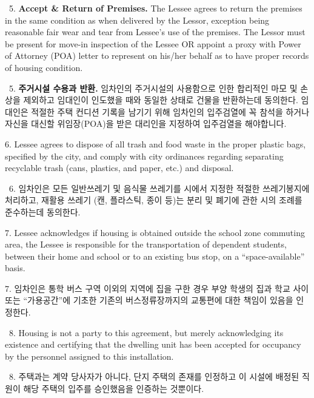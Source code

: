 \documentclass[10pt, letterpaper]{article}
\newcommand{\ul}[1]{\underline{\makebox[#1]{}}}
\newcommand{\init}{\ul{1cm}\ }
\begin{document}
\vspace{3pt}

\init 5. \textbf{Accept \& Return of Premises.} The Lessee agrees to return the premises in the same condition as when delivered by the Lessor, exception being reasonable fair wear and tear from Lessee's use of the premises. The Lessor must be present for move-in inspection of the Lessee OR appoint a proxy with Power of Attorney (POA) letter to represent on his/her behalf as to have proper records of housing condition.

\init 5. \textbf{주거시설 수용과 반환.} 임차인의 주거시설의 사용함으로 인한 합리적인 마모 및 손상을 제외하고 임대인이 인도했을 때와 동일한 상태로 건물을 반환하는데 동의한다. 임대인은 적절한 주택 컨디션 기록을 남기기 위해 임차인의 입주검열에 꼭 참석을 하거나 자신을 대신할 위임장(POA)을 받은 대리인을 지정하여 입주검열을 해야합니다.

\vspace{3pt}

6. Lessee agrees to dispose of all trash and food waste in the proper plastic bags, specified by the city, and comply with city ordinances regarding separating recyclable trash (cans, plastics, and paper, etc.) and disposal.

\init 6. 임차인은 모든 일반쓰레기 및 음식물 쓰레기를 시에서 지정한 적절한 쓰레기봉지에 처리하고, 재활용 쓰레기 (캔, 플라스틱, 종이 등)는 분리 및 폐기에 관한 시의 조례를 준수하는데 동의한다.

\vspace{3pt}

7. Lessee acknowledges if housing is obtained outside the school zone commuting area, the Lessee is responsible for the transportation of dependent students, between their home and school or to an existing bus stop, on a ``space-available'' basis.

7. 임차인은 통학 버스 구역 이외의 지역에 집을 구한 경우 부양 학생의 집과 학교 사이 또는 ``가용공간''에 기초한 기존의 버스정류장까지의 교통편에 대한 책임이 있음을 인정한다.

\vspace{3pt}

\init 8. Housing is not a party to this agreement, but merely acknowledging its existence and certifying that the dwelling unit has been accepted for occupancy by the personnel assigned to this installation.

\init 8. 주택과는 계약 당사자가 아니다, 단지 주택의 존재를 인정하고 이 시설에 배정된 직원이 해당 주택의 입주를 승인했음을 인증하는 것뿐이다.
\end{document}
